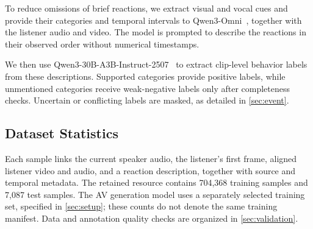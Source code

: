 To reduce omissions of brief reactions, we extract visual
and vocal cues and provide their categories and temporal
intervals to Qwen3-Omni~\cite{qwen3omni}, together with the
listener audio and video. The model is prompted to describe
the reactions in their observed order without numerical
timestamps.

We then use Qwen3-30B-A3B-Instruct-2507~\cite{qwen3} to
extract clip-level behavior labels from these descriptions.
Supported categories provide positive labels, while
unmentioned categories receive weak-negative labels only
after completeness checks. Uncertain or conflicting labels
are masked, as detailed in \cref{sec:event}.

\subsection{Dataset Statistics}
\label{sec:data-statistics}
Each sample links the current speaker audio, the listener's first frame, aligned listener video and audio, and a reaction description, together with source and temporal metadata. The retained resource contains 704,368 training samples and 7,087 test samples. The AV generation model uses a separately selected training set, specified in \cref{sec:setup}; these counts do not denote the same training manifest. Data and annotation quality checks are organized in \cref{sec:validation}.

